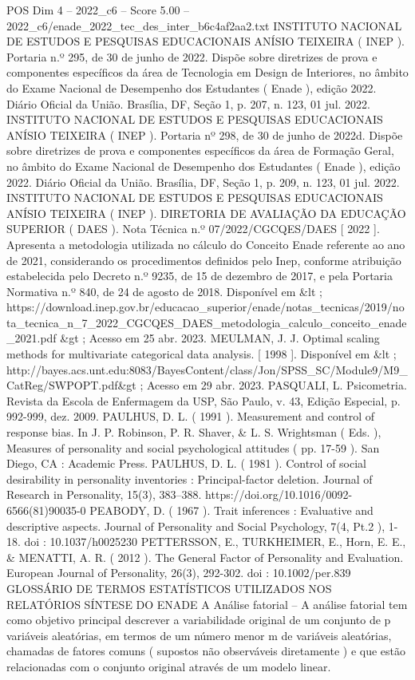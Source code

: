 \begin{textsample}{POS Dim 4 – 2022\_c6 – Score 5.00 – 2022\_c6/enade\_2022\_tec\_des\_inter\_b6c4af2aa2.txt}
INSTITUTO NACIONAL DE ESTUDOS E PESQUISAS EDUCACIONAIS ANÍSIO TEIXEIRA ( INEP ).
Portaria n.º 295, de 30 de junho de 2022.
Dispõe sobre diretrizes de prova e componentes específicos da área de Tecnologia em Design de Interiores, no âmbito do Exame Nacional de Desempenho dos Estudantes ( Enade ), edição 2022.
Diário Oficial da União.
Brasília, DF, Seção 1, p. 207, n. 123, 01 jul. 2022.
INSTITUTO NACIONAL DE ESTUDOS E PESQUISAS EDUCACIONAIS ANÍSIO TEIXEIRA ( INEP ).
Portaria nº 298, de 30 de junho de 2022d.
Dispõe sobre diretrizes de prova e componentes específicos da área de Formação Geral, no âmbito do Exame Nacional de Desempenho dos Estudantes ( Enade ), edição 2022.
Diário Oficial da União.
Brasília, DF, Seção 1, p. 209, n. 123, 01 jul. 2022.
INSTITUTO NACIONAL DE ESTUDOS E PESQUISAS EDUCACIONAIS ANÍSIO TEIXEIRA ( INEP ).
DIRETORIA DE AVALIAÇÃO DA EDUCAÇÃO SUPERIOR ( DAES ).
Nota Técnica n.º 07/2022/CGCQES/DAES [ 2022 ].
Apresenta a metodologia utilizada no cálculo do Conceito Enade referente ao ano de 2021, considerando os procedimentos definidos pelo Inep, conforme atribuição estabelecida pelo Decreto n.º 9235, de 15 de dezembro de 2017, e pela Portaria Normativa n.º 840, de 24 de agosto de 2018.
Disponível em \&lt ; https://download.inep.gov.br/educacao\_superior/enade/notas\_tecnicas/2019/nota\_tecnica\_n\_7\_2022\_CGCQES\_DAES\_metodologia\_calculo\_conceito\_enade\_2021.pdf \&gt ; Acesso em 25 abr. 2023.
MEULMAN, J.
J.
Optimal scaling methods for multivariate categorical data analysis. [ 1998 ].
Disponível em \&lt ; http://bayes.acs.unt.edu:8083/BayesContent/class/Jon/SPSS\_SC/Module9/M9\_CatReg/SWPOPT.pdf\&gt ; Acesso em 29 abr. 2023.
PASQUALI, L.
Psicometria.
Revista da Escola de Enfermagem da USP, São Paulo, v. 43, Edição Especial, p. 992-999, dez. 2009.
PAULHUS, D.
L. ( 1991 ).
Measurement and control of response bias.
In J.
P.
Robinson, P.
R.
Shaver, \& L.
S.
Wrightsman ( Eds. ), Measures of personality and social psychological attitudes ( pp. 17-59 ).
San Diego, CA : Academic Press.
PAULHUS, D.
L. ( 1981 ).
Control of social desirability in personality inventories : Principal-factor deletion.
Journal of Research in Personality, 15(3), 383–388. https://doi.org/10.1016/0092-6566(81)90035-0 PEABODY, D. ( 1967 ).
Trait inferences : Evaluative and descriptive aspects.
Journal of Personality and Social Psychology, 7(4, Pt.2 ), 1-18. doi : 10.1037/h0025230 PETTERSSON, E., TURKHEIMER, E., Horn, E.
E., \& MENATTI, A.
R. ( 2012 ).
The General Factor of Personality and Evaluation.
European Journal of Personality, 26(3), 292-302. doi : 10.1002/per.839 GLOSSÁRIO DE TERMOS ESTATÍSTICOS UTILIZADOS NOS RELATÓRIOS SÍNTESE DO ENADE A Análise fatorial – A análise fatorial tem como objetivo principal descrever a variabilidade original de um conjunto de p variáveis aleatórias, em termos de um número menor m de variáveis aleatórias, chamadas de fatores comuns ( supostos não observáveis diretamente ) e que estão relacionadas com o conjunto original através de um modelo linear.

\end{textsample}
